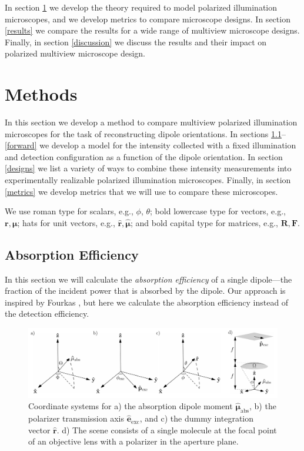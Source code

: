 \documentclass[10pt]{article}
\providecommand{\mb}[1]{\mathbf{#1}}
\providecommand{\mh}[1]{\mathbf{\hat{#1}}}
\providecommand{\bs}[1]{\boldsymbol{#1}}
\begin{document}
In section \ref{methods} we develop the theory required to model polarized
illumination microscopes, and we develop metrics to compare microscope
designs. In section \ref{results} we compare the results for a wide range of
multiview microscope designs. Finally, in section \ref{discussion} we discuss
the results and their impact on polarized multiview microscope design.

\section{Methods}\label{methods}
In this section we develop a method to compare multiview polarized illumination
microscopes for the task of reconstructing dipole orientations. In sections
\ref{excitation}--\ref{forward} we develop a model for the intensity collected
with a fixed illumination and detection configuration as a function of the
dipole orientation. In section \ref{designs} we list a variety of ways to
combine these intensity measurements into experimentally realizable polarized
illumination microscopes. Finally, in section \ref{metrics} we develop metrics
that we will use to compare these microscopes.

We use roman type for scalars, e.g., $\phi$, $\theta$; bold lowercase type for
vectors, e.g., $\mb{r}, \bs{\mu}$; hats for unit vectors, e.g.,
$\mh{r}, \hat{\bs{\mu}}$; and bold capital type for matrices, e.g.,
$\mb{R}, \mb{F}$.

\subsection{Absorption Efficiency}\label{excitation}
In this section we will calculate the \emph{absorption efficiency} of a single
dipole---the fraction of the incident power that is absorbed by the
dipole. Our approach is inspired by Fourkas \cite{fourkas2001}, but here we
calculate the absorption efficiency instead of the detection efficiency.

\begin{figure}[H]
\centering\includegraphics[width=\textwidth]{frames}
\caption{Coordinate systems for a) the absorption dipole moment
  $\hat{\bs{\mu}}_{\text{abs}}$, b) the polarizer transmission axis
  $\hat{\mb{e}}_{\text{exc}}$, and c) the dummy integration vector
  $\hat{\mb{r}}$. d) The scene consists of a single molecule at the focal point
  of an objective lens with a polarizer in the aperture plane.}
\label{fig:coordinates}
\end{figure}
\end{document}
